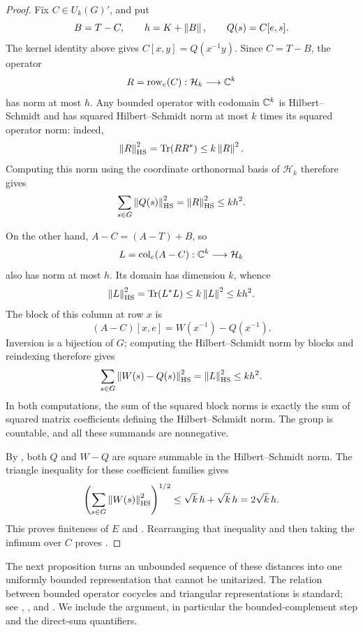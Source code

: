 \begin{proof}
Fix $C\in U_k(G)'$, and put
\[
  B=T-C,\qquad h=K+\left\lVert B\right\rVert,\qquad Q(s)=C[e,s].
\]
The kernel identity above gives $C[x,y]=Q(x^{-1}y)$.
Since $C=T-B$, the operator
\[
  R=\operatorname{row}_e(C):\mathcal H_k\longrightarrow\mathbb C^k
\]
has norm at most $h$.
Any bounded operator with codomain $\mathbb C^k$ is Hilbert--Schmidt and
has squared Hilbert--Schmidt norm at most $k$ times its squared
operator norm: indeed,
\[
  \left\lVert R\right\rVert_{\mathrm{HS}}^2=\operatorname{Tr}(RR^*)\le k\left\lVert R\right\rVert^2.
\]
Computing this norm using the coordinate orthonormal basis of
$\mathcal H_k$ therefore gives
\begin{equation}
\label{eq:kernel-row-energy}
  \sum_{s\in G}\left\lVert Q(s)\right\rVert_{\mathrm{HS}}^2
  =\left\lVert R\right\rVert_{\mathrm{HS}}^2\le kh^2.
\end{equation}

On the other hand, $A-C=(A-T)+B$, so
\[
  L=\operatorname{col}_e(A-C):\mathbb C^k\longrightarrow\mathcal H_k
\]
also has norm at most $h$.
Its domain has dimension $k$, whence
\[
  \left\lVert L\right\rVert_{\mathrm{HS}}^2=\operatorname{Tr}(L^*L)\le k\left\lVert L\right\rVert^2\le kh^2.
\]
The block of this column at row $x$ is
\[
  (A-C)[x,e]=W(x^{-1})-Q(x^{-1}).
\]
Inversion is a bijection of $G$; computing the Hilbert--Schmidt norm
by blocks and reindexing therefore gives
\begin{equation}
\label{eq:kernel-column-energy}
  \sum_{s\in G}\left\lVert W(s)-Q(s)\right\rVert_{\mathrm{HS}}^2
  =\left\lVert L\right\rVert_{\mathrm{HS}}^2\le kh^2.
\end{equation}
In both computations, the sum of the squared block norms is exactly
the sum of squared matrix coefficients defining the
Hilbert--Schmidt norm.  The group is countable, and all these
summands are nonnegative.

By , both $Q$
and $W-Q$ are square summable in the Hilbert--Schmidt norm.
The triangle inequality for these coefficient families gives
\[
  \left(\sum_{s\in G}\left\lVert W(s)\right\rVert_{\mathrm{HS}}^2\right)^{1/2}
  \le \sqrt{k}\,h+\sqrt{k}\,h=2\sqrt{k}\,h.
\]
This proves finiteness of $E$ and
.
Rearranging that inequality and then taking the infimum over $C$
proves .
\end{proof}

The next proposition turns an unbounded sequence of these distances
into one uniformly bounded representation that cannot be
unitarized.  The relation between bounded operator cocycles and
triangular representations is standard; see
\cite[Proposition~2.4]{EpsteinMonod2009},
\cite[Section~2]{MonodOzawa2010}, and
\cite[Remark~4 and Proposition~5(ii)]{Pisier2011}.
We include the argument, in particular the bounded-complement step
and the direct-sum quantifiers.

